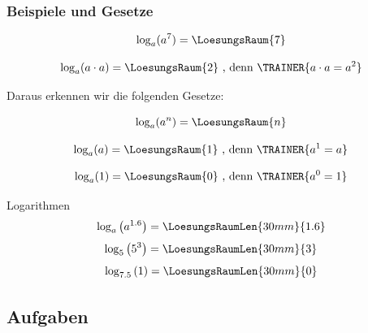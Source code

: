 \subsubsection{Beispiele und Gesetze}
 
 \begin{beispiel}{}{}
   $$\log_a(a^7) = \LoesungsRaum{7}$$
\end{beispiel}


\begin{beispiel}{}{}
   $$\log_a(a\cdot{}a) = \LoesungsRaum{2} \text{ , denn } \TRAINER{a\cdot{}a = a^2}$$
\end{beispiel}


Daraus erkennen wir die folgenden Gesetze:

\begin{gesetz}{}{}
  $$\log_a(a^n) = \LoesungsRaum{n}$$
\end{gesetz}

 \begin{gesetz}{}{}
   $$\log_a(a) = \LoesungsRaum{1} \text{ , denn } \TRAINER{a^1 = a}$$
\end{gesetz}

 \begin{gesetz}{}{}
   $$\log_a(1) = \LoesungsRaum{0} \text{ , denn } \TRAINER{a^0 = 1}$$
\end{gesetz}

 \begin{beispiel}{Logarithmen}{}
   $$\log_a\left(a^{1.6}\right) = \LoesungsRaumLen{30mm}{1.6}$$
   $$\log_5\left(5^{3}\right) = \LoesungsRaumLen{30mm}{3}$$
   $$\log_{7.5}\left(1\right) = \LoesungsRaumLen{30mm}{0}$$
\end{beispiel}




\newpage

\newpage
\subsection*{Aufgaben}


